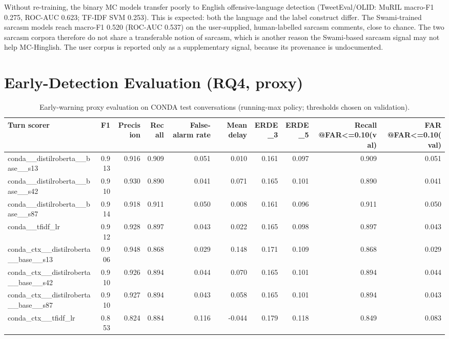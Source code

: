 \documentclass[10pt,twocolumn]{article}
\begin{document}
Without re-training, the binary MC models transfer poorly to English offensive-language detection (TweetEval/OLID:
MuRIL macro-F1 0.275, ROC-AUC 0.623; TF-IDF SVM
0.253). This is expected: both the language and the label construct differ. The
Swami-trained sarcasm models reach macro-F1 0.520 (ROC-AUC
0.537) on the user-supplied, human-labelled sarcasm comments, close to chance.
The two sarcasm corpora therefore do not share a transferable notion of sarcasm, which is another reason the Swami-based
sarcasm signal may not help MC-Hinglish. The user corpus is reported only as a supplementary signal, because its provenance
is undocumented.

\section{Early-Detection Evaluation (RQ4, proxy)}

\begin{table}[t]
\centering
\small
\caption{Early-warning proxy evaluation on CONDA test conversations (running-max policy; thresholds chosen on validation).}
\label{tab:early}
\begin{adjustbox}{max width=\textwidth}\begin{tabular}{lrrrrrrrrr}
\toprule
Turn scorer & F1 & Precision & Recall & False-alarm rate & Mean delay & ERDE\_3 & ERDE\_5 & Recall @FAR<=0.10(val) & FAR @FAR<=0.10(val) \\
\midrule
conda\_\_distilroberta\_\_base\_\_s13 & 0.913 & 0.916 & 0.909 & 0.051 & 0.010 & 0.161 & 0.097 & 0.909 & 0.051 \\
conda\_\_distilroberta\_\_base\_\_s42 & 0.910 & 0.930 & 0.890 & 0.041 & 0.071 & 0.165 & 0.101 & 0.890 & 0.041 \\
conda\_\_distilroberta\_\_base\_\_s87 & 0.914 & 0.918 & 0.911 & 0.050 & 0.008 & 0.161 & 0.096 & 0.911 & 0.050 \\
conda\_\_tfidf\_lr & 0.912 & 0.928 & 0.897 & 0.043 & 0.022 & 0.165 & 0.098 & 0.897 & 0.043 \\
conda\_ctx\_\_distilroberta\_\_base\_\_s13 & 0.906 & 0.948 & 0.868 & 0.029 & 0.148 & 0.171 & 0.109 & 0.868 & 0.029 \\
conda\_ctx\_\_distilroberta\_\_base\_\_s42 & 0.910 & 0.926 & 0.894 & 0.044 & 0.070 & 0.165 & 0.101 & 0.894 & 0.044 \\
conda\_ctx\_\_distilroberta\_\_base\_\_s87 & 0.910 & 0.927 & 0.894 & 0.043 & 0.058 & 0.165 & 0.101 & 0.894 & 0.043 \\
conda\_ctx\_\_tfidf\_lr & 0.853 & 0.824 & 0.884 & 0.116 & -0.044 & 0.179 & 0.118 & 0.849 & 0.083 \\
\bottomrule
\end{tabular}\end{adjustbox}
\end{table}
\end{document}
